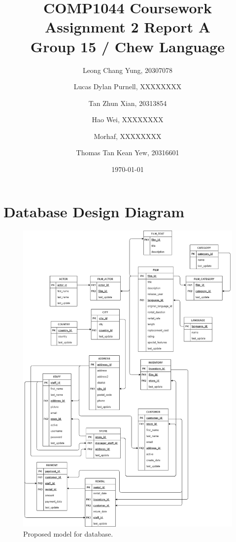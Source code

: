 \documentclass{article}
\title{COMP1044 Coursework Assignment 2 Report A \\ Group 15 / Chew Language}
\author{
	Leong Chang Yung, 20307078
	\and
	Lucas Dylan Purnell, XXXXXXXX
	\and
	Tan Zhun Xian, 20313854
	\and
	Hao Wei, XXXXXXXX
	\and
	Morhaf, XXXXXXXX
	\and
	Thomas Tan Kean Yew, 20316601
}
\date{\today}
\begin{document}
\maketitle
\newpage
\section{Database Design Diagram}
	\begin{figure}[H]
		\includegraphics[width=\textwidth]{DBI CourseworkA}
		\caption{Proposed model for database.}	
	\end{figure}
		
\end{document}
